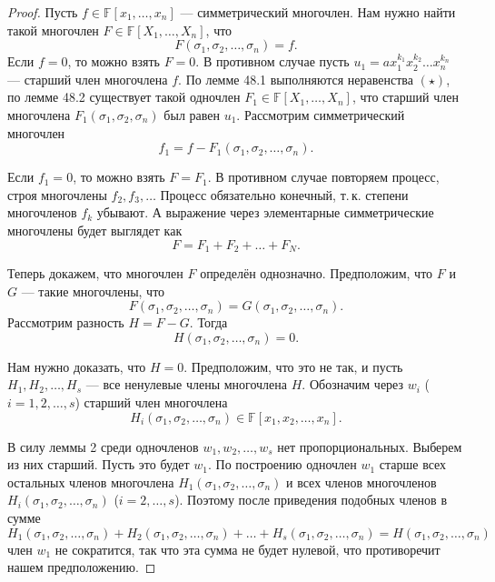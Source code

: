 \begin{proof}
    Пусть $f \in \mathbb{F}[x_1, \ldots, x_n]$ --- симметрический многочлен. Нам нужно найти такой многочлен $F \in \mathbb{F}[X_1, \ldots, X_n]$, что
    $$
    F(\sigma_1, \sigma_2, \ldots, \sigma_n) = f.
    $$
    Если $f = 0$, то можно взять $F = 0$. В противном случае пусть $u_1 = ax_1^{k_1}x_2^{k_2}\ldots x_n^{k_n}$ --- старший член многочлена $f$. По лемме 48.1 выполняются неравенства $(\star)$, по лемме 48.2 существует такой одночлен $F_1 \in \mathbb{F}[X_1, \ldots, X_n]$, что старший член многочлена $F_1(\sigma_1, \sigma_2, \sigma_n)$ был равен $u_1$. Рассмотрим симметрический многочлен
    $$
    f_1 = f - F_1(\sigma_1, \sigma_2, \ldots, \sigma_n).
    $$

    Если $f_1 = 0$, то можно взять $F = F_1$. В противном случае повторяем процесс, строя многочлены $f_2, f_3, \ldots$ Процесс обязательно конечный, т.\,к. степени многочленов $f_k$ убывают. А выражение через элементарные симметрические многочлены будет выглядет как
    $$
    F = F_1 + F_2 + \ldots + F_N.
    $$

    Теперь докажем, что многочлен $F$ определён однозначно. Предположим, что $F$ и $G$ --- такие многочлены, что
    $$
    F(\sigma_1, \sigma_2, \ldots, \sigma_n) = G(\sigma_1, \sigma_2, \ldots, \sigma_n).
    $$
    Рассмотрим разность $H = F - G$. Тогда
    $$
    H(\sigma_1, \sigma_2, \ldots, \sigma_n) = 0.
    $$

    Нам нужно доказать, что $H = 0$. Предположим, что это не так, и пусть $H_1, H_2, \ldots, H_s$ --- все ненулевые члены многочлена $H$. Обозначим через $w_i$ ($i = 1, 2, \ldots, s$) старший член многочлена
    $$
    H_i(\sigma_1, \sigma_2, \ldots, \sigma_n) \in \mathbb{F}[x_1, x_2, \ldots, x_n].
    $$

    В силу леммы 2 среди одночленов $w_1, w_2, \ldots, w_s$ нет пропорциональных. Выберем из них старший. Пусть это будет $w_1$. По построению одночлен $w_1$ старше всех остальных членов многочлена $H_1(\sigma_1, \sigma_2, \ldots, \sigma_n)$ и всех членов многочленов $H_i(\sigma_1, \sigma_2, \ldots, \sigma_n)$ ($i = 2, \ldots, s$). Поэтому после приведения подобных членов в сумме
    $$
    H_1(\sigma_1, \sigma_2, \ldots, \sigma_n) + H_2(\sigma_1, \sigma_2, \ldots, \sigma_n) + \ldots + H_s(\sigma_1, \sigma_2, \ldots, \sigma_n) = H(\sigma_1, \sigma_2, \ldots, \sigma_n)
    $$
    член $w_1$ не сократится, так что эта сумма не будет нулевой, что противоречит нашем предположению.
\end{proof}


